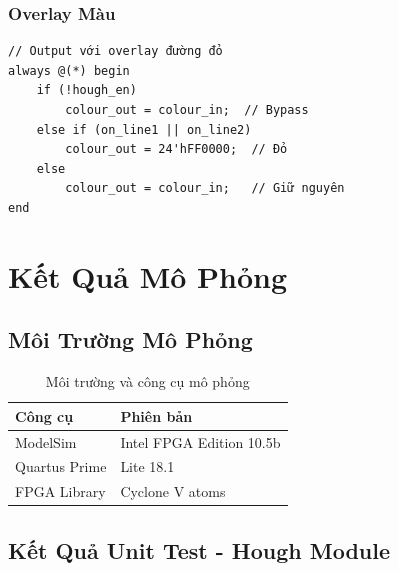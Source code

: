 \documentclass[12pt,a4paper]{report}
\begin{document}
\subsection{Overlay Màu}
\begin{lstlisting}[caption={Colour overlay logic}, label={lst:overlay}]
// Output với overlay đường đỏ
always @(*) begin
    if (!hough_en)
        colour_out = colour_in;  // Bypass
    else if (on_line1 || on_line2)
        colour_out = 24'hFF0000;  // Đỏ
    else
        colour_out = colour_in;   // Giữ nguyên
end
\end{lstlisting}

\chapter{Kết Quả Mô Phỏng}

\section{Môi Trường Mô Phỏng}

\begin{table}[H]
\centering
\caption{Môi trường và công cụ mô phỏng}
\begin{tabular}{|l|l|}
\hline
\textbf{Công cụ} & \textbf{Phiên bản} \\
\hline
ModelSim & Intel FPGA Edition 10.5b \\
Quartus Prime & Lite 18.1 \\
FPGA Library & Cyclone V atoms \\
\hline
\end{tabular}
\end{table}

\section{Kết Quả Unit Test - Hough Module}
\end{document}
